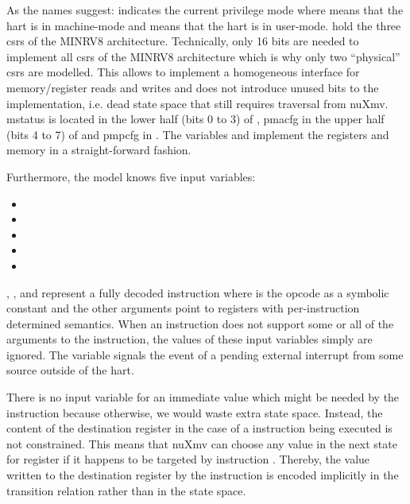As the names suggest:  indicates the current privilege mode where  means that the \gls{hart} is in machine-mode and  means that the \gls{hart} is in user-mode.
 hold the three \glspl{csr} of the MINRV8 architecture.
Technically, only 16 bits are needed to implement all \glspl{csr} of the MINRV8 architecture which is why only two \enquote{physical} \glspl{csr} are modelled.
This allows to implement a homogeneous interface for memory/register reads and writes and does not introduce unused bits to the implementation, i.e. dead state space that still requires traversal from nuXmv.
\gls{mstatus} is located in the lower half (bits 0 to 3) of , \gls{pmacfg} in the upper half (bits 4 to 7) of  and \gls{pmpcfg} in .
The variables  and  implement the registers and memory in a straight-forward fashion.

Furthermore, the model knows five input variables:
\begin{itemize}
    \item {}
    \item {}
    \item {}
    \item {}
    \item {}
\end{itemize}

, ,  and  represent a fully decoded instruction where  is the opcode as a symbolic constant and the other arguments point to registers with per-instruction determined semantics.
When an instruction does not support some or all of the arguments to the instruction, the values of these input variables simply are ignored.
The variable  signals the event of a pending external interrupt from some source outside of the \gls{hart}.

There is no input variable for an immediate value which might be needed by the  instruction because otherwise, we would waste extra state space.
Instead, the content of the destination register in the case of a  instruction being executed is not constrained.
This means that nuXmv can choose any value in the next state for register  if it happens to be targeted by instruction .
Thereby, the value written to the destination register by the  instruction is encoded implicitly in the transition relation rather than in the state space.

